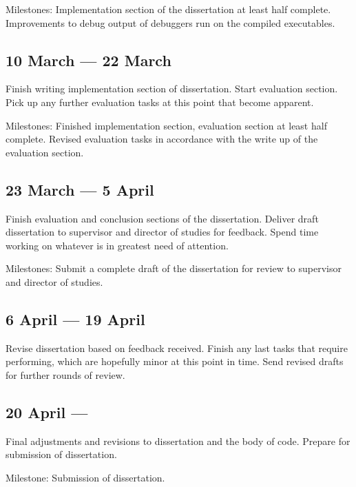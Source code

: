 Milestones: Implementation section of the dissertation at least half complete.
Improvements to debug output of debuggers run on the compiled executables.

\subsection*{10 March --- 22 March}

Finish writing implementation section of dissertation. Start evaluation
section. Pick up any further evaluation tasks at this point that become
apparent.

Milestones: Finished implementation section, evaluation section at least half
complete. Revised evaluation tasks in accordance with the write up of the
evaluation section.

\subsection*{23 March --- 5 April}

Finish evaluation and conclusion sections of the dissertation. Deliver draft
dissertation to supervisor and director of studies for feedback. Spend time
working on whatever is in greatest need of attention.

Milestones: Submit a complete draft of the dissertation for review to
supervisor and director of studies.

\subsection*{6 April --- 19 April}

Revise dissertation based on feedback received. Finish any last tasks that
require performing, which are hopefully minor at this point in time. Send
revised drafts for further rounds of review.

\subsection*{20 April ---}

Final adjustments and revisions to dissertation and the body of code. Prepare
for submission of dissertation.

Milestone: Submission of dissertation.
